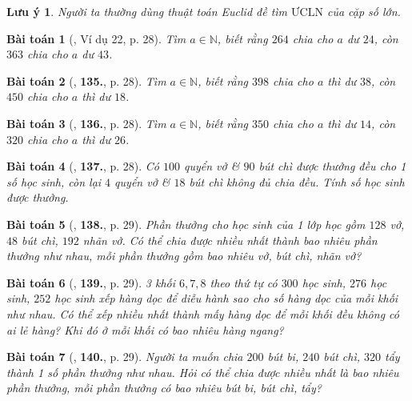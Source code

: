 \documentclass{article}
\numberwithin{equation}{section}
\newtheorem{baitoan}{Bài toán}[section]
\newtheorem{luuy}{Lưu ý}[section]
\begin{document}
\begin{luuy}
	Người ta thường dùng thuật toán Euclid đề tìm $\mbox{ƯCLN}$ của cặp số lớn.
\end{luuy}

\begin{baitoan}[\cite{Binh_Toan_6_tap_1}, Ví dụ 22, p. 28]
	Tìm $a\in\mathbb{N}$, biết rằng $264$ chia cho $a$ dư $24$, còn $363$ chia cho $a$ dư $43$.
\end{baitoan}

\begin{baitoan}[\cite{Binh_Toan_6_tap_1}, \textbf{135.}, p. 28]
	Tìm $a\in\mathbb{N}$, biết rằng $398$ chia cho $a$ thì dư $38$, còn $450$ chia cho $a$ thì dư $18$.
\end{baitoan}

\begin{baitoan}[\cite{Binh_Toan_6_tap_1}, \textbf{136.}, p. 28]
	Tìm $a\in\mathbb{N}$, biết rằng $350$ chia cho $a$ thì dư $14$, còn $320$ chia cho $a$ thì dư $26$.
\end{baitoan}

\begin{baitoan}[\cite{Binh_Toan_6_tap_1}, \textbf{137.}, p. 28]
	Có $100$ quyển vở \& $90$ bút chì được thưởng đều cho 1 số học sinh, còn lại $4$ quyển vở \& $18$ bút chì không đủ chia đều. Tính số học sinh được thưởng.
\end{baitoan}

\begin{baitoan}[\cite{Binh_Toan_6_tap_1}, \textbf{138.}, p. 29]
	Phần thưởng cho học sinh của 1 lớp học gồm $128$ vở, $48$ bút chì, $192$ nhãn vở. Có thể chia được nhiều nhất thành bao nhiêu phần thưởng như nhau, mỗi phần thưởng gồm bao nhiêu vở, bút chì, nhãn vở?
\end{baitoan}

\begin{baitoan}[\cite{Binh_Toan_6_tap_1}, \textbf{139.}, p. 29]
	3 khối $6,7,8$ theo thứ tự có $300$ học sinh, $276$ học sinh, $252$ học sinh xếp hàng dọc để diễu hành sao cho số hàng dọc của mỗi khối như nhau. Có thể xếp nhiều nhất thành mấy hàng dọc để mỗi khối đều không có ai lẻ hàng? Khi đó ở mỗi khối có bao nhiêu hàng ngang?
\end{baitoan}

\begin{baitoan}[\cite{Binh_Toan_6_tap_1}, \textbf{140.}, p. 29]
	Người ta muốn chia $200$ bút bi, $240$ bút chì, $320$ tẩy thành 1 số phần thưởng như nhau. Hỏi có thể chia được nhiều nhất là bao nhiêu phần thưởng, mỗi phần thưởng có bao nhiêu bút bi, bút chì, tẩy?
\end{baitoan}
\end{document}
